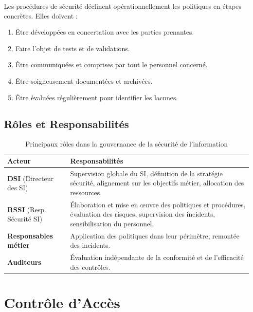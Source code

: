 Les procédures de sécurité déclinent opérationnellement les politiques en étapes concrètes. Elles doivent :
\begin{enumerate}
    \item Être développées en concertation avec les parties prenantes.
    \item Faire l'objet de tests et de validations.
    \item Être communiquées et comprises par tout le personnel concerné.
    \item Être soigneusement documentées et archivées.
    \item Être évaluées régulièrement pour identifier les lacunes.
\end{enumerate}

\subsection{Rôles et Responsabilités}

\begin{table}[H]
\centering
\begin{tabular}{p{3.5cm}p{9cm}}
    \toprule
    \textbf{Acteur} & \textbf{Responsabilités} \\
    \midrule
    \textbf{DSI} (Directeur des SI) & Supervision globale du SI, définition de la stratégie sécurité, alignement sur les objectifs métier, allocation des ressources. \\
    \midrule
    \textbf{RSSI} (Resp. Sécurité SI) & Élaboration et mise en œuvre des politiques et procédures, évaluation des risques, supervision des incidents, sensibilisation du personnel. \\
    \midrule
    \textbf{Responsables métier} & Application des politiques dans leur périmètre, remontée des incidents. \\
    \midrule
    \textbf{Auditeurs} & Évaluation indépendante de la conformité et de l'efficacité des contrôles. \\
    \bottomrule
\end{tabular}
\caption{Principaux rôles dans la gouvernance de la sécurité de l'information}
\end{table}

\section{Contrôle d'Accès}

